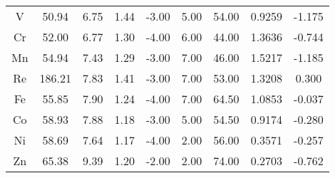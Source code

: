 \begin{center}
\begin{longtable}{c|c@{\hskip3pt} c@{\hskip3pt} c@{\hskip3pt} c@{\hskip3pt} c@{\hskip3pt} c@{\hskip3pt} c@{\hskip3pt} c@{\hskip3pt}}
V         & 50.94       & 6.75     & 1.44    & -3.00        & 5.00           & 54.00          & 0.9259          & -1.175   \\
Cr        & 52.00       & 6.77     & 1.30    & -4.00        & 6.00           & 44.00          & 1.3636          & -0.744   \\
Mn        & 54.94       & 7.43     & 1.29    & -3.00        & 7.00           & 46.00          & 1.5217          & -1.185   \\
Re        & 186.21      & 7.83     & 1.41    & -3.00        & 7.00           & 53.00          & 1.3208          & 0.300    \\
Fe        & 55.85       & 7.90     & 1.24    & -4.00        & 7.00           & 64.50          & 1.0853          & -0.037   \\
Co        & 58.93       & 7.88     & 1.18    & -3.00        & 5.00           & 54.50          & 0.9174          & -0.280   \\
Ni        & 58.69       & 7.64     & 1.17    & -4.00        & 2.00           & 56.00          & 0.3571          & -0.257   \\
Zn        & 65.38       & 9.39     & 1.20    & -2.00        & 2.00           & 74.00          & 0.2703          & -0.762              
\end{longtable}
\end{center}